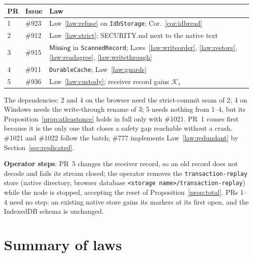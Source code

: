 \documentclass[journal]{IEEEtran}
\newcommand{\Missing}{\mathsf{Missing}}
\newcommand{\K}{\mathcal{K}}
\newcommand{\issue}[1]{\#{#1}}
\begin{document}
\begin{center}
\footnotesize
\begin{tabular}{@{}llp{}@{}}
\toprule
PR & Issue & Law\\
\midrule
1 & \issue{923} & Law~\ref{law:refuse} on \texttt{IdbStorage}; Cor.~\ref{cor:idbread}\\
2 & \issue{912} & Law~\ref{law:strict}; SECURITY.md next to the native text\\
3 & \issue{915} & $\Missing$ in \texttt{ScannedRecord}; Laws~\ref{law:writeorder},
\ref{law:restore}, \ref{law:readagree}, \ref{law:writethrough}\\
4 & \issue{911} & \texttt{DurableCache}; Law~\ref{law:guards}\\
5 & \issue{936} & Law~\ref{law:custody}; receiver record gains $\K_s$\\
\bottomrule
\end{tabular}
\end{center}

The dependencies: 2 and 4 on the browser need the strict-commit seam of 2; 4 on Windows
needs the write-through rename of 3; 5 needs nothing from 1--4, but its
Proposition~\ref{prop:atleastonce} holds in full only with \issue{1021}.  PR~1 comes first because
it is the only one that closes a safety gap reachable without a crash.  \issue{1021} and
\issue{1022} follow the batch; \issue{777} implements Law~\ref{law:redundant} by
Section~\ref{sec:replicated}.

\textbf{Operator steps}: PR~5 changes the
receiver record, so an old record does not decode and fails its stream closed; the operator
removes the \texttt{transaction-replay} store (native directory, browser database
\texttt{<storage name>/transaction-replay}) while the node is stopped, accepting the reset of
Proposition~\ref{prop:total}.  PRs 1--4 need no step: an existing native store gains its
markers at its first open, and the IndexedDB schema is unchanged.

\section{Summary of laws}
\end{document}
